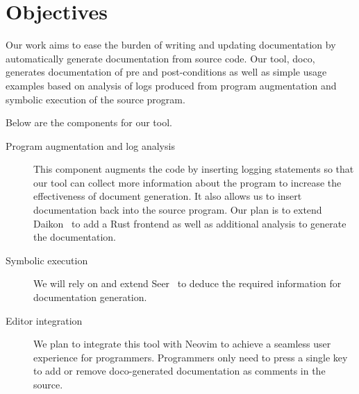 \section{Objectives}

Our work aims to ease the burden of writing and updating documentation by automatically generate documentation from source code. Our tool, doco, generates documentation of pre and post-conditions as well as simple usage examples based on analysis of logs produced from program augmentation and symbolic execution of the source program.

Below are the components for our tool.
\begin{description}
  \item [Program augmentation and log analysis] This component augments the code by inserting logging statements so that our tool can collect more information about the program to increase the effectiveness of document generation. It also allows us to insert documentation back into the source program. Our plan is to extend Daikon~\cite{Ernst:2007} to add a Rust frontend as well as additional analysis to generate the documentation.
  \item [Symbolic execution] We will rely on and extend Seer~\cite{Renshaw:2018} to deduce the required information for documentation generation.
  \item [Editor integration] We plan to integrate this tool with Neovim \cite{NeovimTeam:2018} to achieve a seamless user experience for programmers. Programmers only need to press a single key to add or remove doco-generated documentation as comments in the source.
\end{description}
